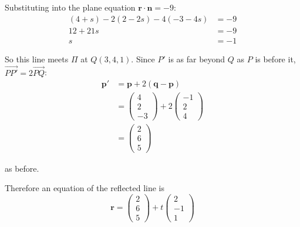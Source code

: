 \documentclass[leqno]{article}
\begin{document}
\begin{enumerate}[
  label=\textbf{\arabic*.},
  leftmargin=*,
  topsep=0pt,
  partopsep=0pt,
  parsep=0pt
]
\begin{djsSolution}
\begin{enumerate}[label=\textbf{(\roman*)}]
{Substituting into the plane equation \(\mathbf r\cdot\mathbf n=-9\):
\begin{align*}
(4+s)-2(2-2s)-4(-3-4s)&=-9 \\
12+21s&=-9 \\
s&=-1
\end{align*}

So this line meets \(\Pi\) at \(Q(3,4,1)\). Since \(P'\) is as far beyond \(Q\) as \(P\) is before it, \(\overrightarrow{PP'}=2\overrightarrow{PQ}\):
\begin{align*}
\mathbf p'&=\mathbf p+2(\mathbf q-\mathbf p) \\
&=\begin{pmatrix}4\\2\\-3\end{pmatrix}+2\begin{pmatrix}-1\\2\\4\end{pmatrix} \\
&=\begin{pmatrix}2\\6\\5\end{pmatrix}
\end{align*}

as before.
\par}

\vspace{8pt}
Therefore an equation of the reflected line is
\[
\mathbf r=\begin{pmatrix}2\\6\\5\end{pmatrix}+t\begin{pmatrix}2\\-1\\1\end{pmatrix}
\]
\end{enumerate}
\end{djsSolution}


\newpage

\questionitem


\end{enumerate}
\end{document}
